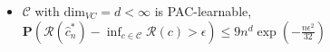 \begin{itemize}[itemsep=0pt,topsep=0pt, leftmargin=2pt, itemindent=5pt, labelwidth=5pt]
    \item $\mathcal{C}$ with $\mathrm{dim}_{VC} = d<\infty$ is PAC-learnable, $\mathbf{P}(\mathcal{R}(\hat{c}_{n}^{*})-\inf _{c \in \mathcal{C}} \mathcal{R}(c)>\epsilon) \leq 9 n^{d} \exp (-\frac{n \epsilon^{2}}{32})$
\end{itemize}
